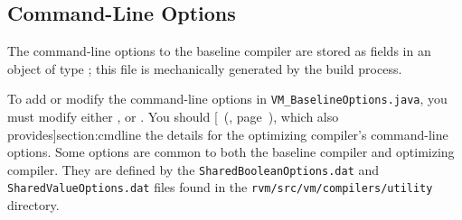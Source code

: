 \subsection{Command-Line Options}%

The command-line options to the baseline compiler are
stored as fields in an object of type ; this
file is mechanically generated by the build process. 

To add or modify the command-line options in {\tt VM\_BaselineOptions.java},
you must modify either , or .
You should [~(\Ref, page~\Pageref{}), which also
  provides]{section:cmdline} the
details for the optimizing compiler's command-line options.
Some options are common to both the baseline compiler and optimizing
compiler. They are defined by the {\tt SharedBooleanOptions.dat} and
{\tt SharedValueOptions.dat} files found in the
{\tt rvm/\-src/\-vm/\-com\-pi\-lers/\-u\-til\-i\-ty} directory. 
